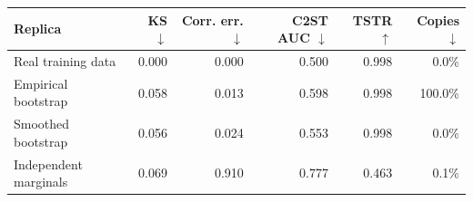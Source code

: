 \begin{tabular}{lrrrrr}
\toprule
Replica & KS $\downarrow$ & Corr. err. $\downarrow$ & C2ST AUC $\downarrow$ & TSTR $\uparrow$ & Copies $\downarrow$ \\
\midrule
Real training data & 0.000 & 0.000 & 0.500 & 0.998 & 0.0\% \\
Empirical bootstrap & 0.058 & 0.013 & 0.598 & 0.998 & 100.0\% \\
Smoothed bootstrap & 0.056 & 0.024 & 0.553 & 0.998 & 0.0\% \\
Independent marginals & 0.069 & 0.910 & 0.777 & 0.463 & 0.1\% \\
\bottomrule
\end{tabular}
